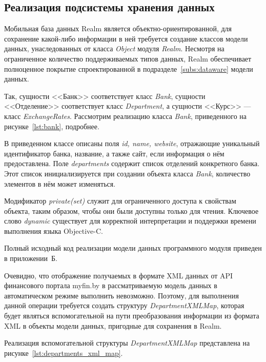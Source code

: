 \pagebreak



\subsection{Реализация подсистемы хранения данных}
\label{subs:impl_storage}

Мобильная база данных Realm является объектно-ориентированной,
для сохранение какой-либо информации в ней требуется создание классов
модели данных, унаследованных от класса \textit{Object} модуля \textit{Realm}.
Несмотря на ограниченное количество поддерживаемых типов данных,
Realm обеспечивает полноценное покрытие спроектированной в
подразделе~\ref{subs:dataware} модели данных.

Так, сущности <<Банк>> соответствует класс \textit{Bank}, сущности <<Отделение>>
соответствует класс \textit{Department}, а сущности <<Курс>> ---
класс \textit{ExchangeRates}. Рассмотрим реализацию класса \textit{Bank},
приведенного на рисунке~\ref{lst:bank}, подробнее.


В приведенном классе описаны поля \textit{id, name, website}, отражающие
уникальный идентификатор банка, название, а также сайт, если
информация о нём предоставлена. Поле \textit{departments} содержит список
отделений конкретного банка. Этот список инициализируется при создании объекта
класса \textit{Bank}, количество элементов в нём может изменяться.

Модификатор \textit{private(set)} служит для ограниченного доступа
к свойствам объекта, таким образом, чтобы они были доступны только для чтения.
Ключевое слово \textit{dynamic} существует для корректной интерпретации и поддержки
времени выполнения языка Objective-C.

Полный исходный код реализации модели данных программного модуля
приведен в приложении~Б.

Очевидно, что отображение получаемых в формате XML данных от API финансового
портала myfin.by в рассматриваемую модель данных в автоматическом режиме
выполнить невозможно. Поэтому, для выполнения данной операции требуется создать
структуру \textit{DepartmentXMLMap}, которая будет являться вспомогательной
на пути преобразования информации из формата XML в объекты модели данных,
пригодные для сохранения в Realm.

Реализация вспомогательной структуры \textit{DepartmentXMLMap} представлена
на рисунке~\ref{lst:departments_xml_map}.


